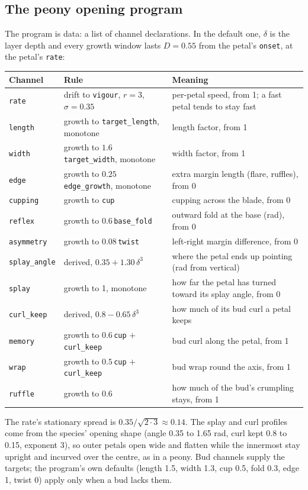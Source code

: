 \subsection{The peony opening program}\label{sec:opening-program}
The program is data: a list of channel declarations. In the default one,
$\delta$ is the layer depth and every growth window lasts $D = 0.55$ from the
petal's \texttt{onset}, at the petal's \texttt{rate}:
\begin{center}\small
\begin{tabularx}{\linewidth}{@{}l l X@{}}
\toprule
Channel & Rule & Meaning \\
\midrule
\texttt{rate} & drift to \texttt{vigour}, $r=3$, $\sigma=0.35$ & per-petal speed, from 1; a fast petal tends to stay fast \\
\texttt{length} & growth to \texttt{target\_length}, monotone & length factor, from 1 \\
\texttt{width} & growth to $1.6\,$\texttt{target\_width}, monotone & width factor, from 1 \\
\texttt{edge} & growth to $0.25\,$\texttt{edge\_growth}, monotone & extra margin length (flare, ruffles), from 0 \\
\texttt{cupping} & growth to \texttt{cup} & cupping across the blade, from 0 \\
\texttt{reflex} & growth to $0.6\,$\texttt{base\_fold} & outward fold at the base (rad), from 0 \\
\texttt{asymmetry} & growth to $0.08\,$\texttt{twist} & left-right margin difference, from 0 \\
\texttt{splay\_angle} & derived, $0.35 + 1.30\,\delta^3$ & where the petal ends up pointing (rad from vertical) \\
\texttt{splay} & growth to 1, monotone & how far the petal has turned toward its splay angle, from 0 \\
\texttt{curl\_keep} & derived, $0.8 - 0.65\,\delta^3$ & how much of its bud curl a petal keeps \\
\texttt{memory} & growth to $0.6\,$\texttt{cup} $+$ \texttt{curl\_keep} & bud curl along the petal, from 1 \\
\texttt{wrap} & growth to $0.5\,$\texttt{cup} $+$ \texttt{curl\_keep} & bud wrap round the axis, from 1 \\
\texttt{ruffle} & growth to 0.6 & how much of the bud's crumpling stays, from 1 \\
\bottomrule
\end{tabularx}
\end{center}
The rate's stationary spread is $0.35/\sqrt{2\cdot3} \approx 0.14$. The splay
and curl profiles come from the species' opening shape (angle 0.35 to 1.65 rad,
curl kept 0.8 to 0.15, exponent 3), so outer petals open wide and flatten while
the innermost stay upright and incurved over the centre, as in a peony. Bud
channels supply the targets; the program's own defaults (length 1.5, width
1.3, cup 0.5, fold 0.3, edge 1, twist 0) apply only when a bud lacks them.

